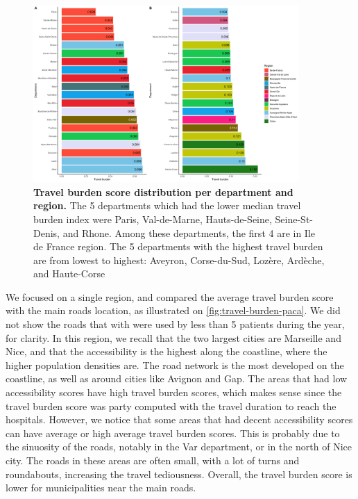 \begin{figure}[h!]
    \includegraphics[width=0.9\textwidth]{images/routes/sup_fig_2.png}
    \centering
    \caption{
        \textbf{Travel burden score distribution per department and region.}
        The 5 departments which had the lower median travel burden index were
        Paris, Val-de-Marne, Hauts-de-Seine, Seine-St-Denis, and Rhone. Among these
        departments, the first 4 are in Ile de France region. The 5 departments with the
        highest travel burden are from lowest to highest: Aveyron, Corse-du-Sud, Lozère,
        Ardèche, and Haute-Corse}
    \label{fig:routes-burden-departments-top-bottom-20}
\end{figure}

We focused on a single region, and compared the average travel burden score with
the main roads location, as illustrated on \cref{fig:travel-burden-paca}. We did
not show the roads that with were used by less than 5 patients during the year,
for clarity. In this region, we recall that the two largest cities are Marseille
and Nice, and that the accessibility is the highest along the coastline, where
the higher population densities are. The road network is the most developed on
the coastline, as well as around cities like Avignon and Gap. The areas that had
low accessibility scores have high travel burden scores, which makes sense since
the travel burden score was party computed with the travel duration to reach the
hospitals. However, we notice that some areas that had decent accessibility
scores can have average or high average travel burden scores. This is probably
due to the sinuosity of the roads, notably in the Var department, or in the
north of Nice city. The roads in these areas are often small, with a lot of
turns and roundabouts, increasing the travel tediousness. Overall, the travel
burden score is lower for municipalities near the main roads.

